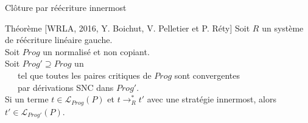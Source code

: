 \begin{frame}{Clôture par réécriture innermost}
  \begin{alertblock}{Théorème [WRLA, 2016, Y. Boichut, V. Pelletier et P. Réty]}
    Soit $R$ un système de réécriture linéaire gauche.\\
    \pause
    Soit $Prog$ un \csprogramme normalisé et non copiant.\\
    \pause
    Soit $Prog' \supseteq Prog$ un \csprogramme \\
    \pause
    ~~~tel que toutes les paires critiques de $Prog$ sont convergentes\\
    ~~~par dérivations SNC dans $Prog'$.\\
    \pause
    Si un terme $t \in \mathcal{L}_{Prog}(P)$ et $t \rightarrow^*_R t'$ avec une stratégie innermost, alors $t' \in \mathcal L_{Prog'}(P)$.
  \end{alertblock}
\end{frame}

